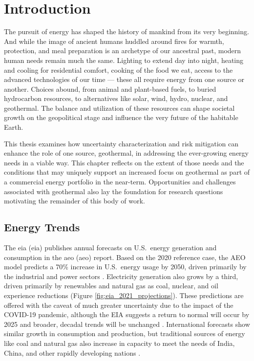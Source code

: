 \chapter{Introduction}\label{ch1:intro}
The pursuit of energy has shaped the history of mankind from its very beginning. And while the image of ancient humans huddled around fires for warmth, protection, and meal preparation is an archetype of our ancestral past, modern human needs remain much the same. Lighting to extend day into night, heating and cooling for residential comfort, cooking of the food we eat, access to the advanced technologies of our time --- these all require energy from one source or another. Choices abound, from animal and plant-based fuels, to buried hydrocarbon resources, to alternatives like solar, wind, hydro, nuclear, and geothermal. The balance and utilization of these resources can shape societal growth on the geopolitical stage and influence the very future of the habitable Earth.

This thesis examines how uncertainty characterization and risk mitigation can enhance the role of one source, geothermal, in addressing the ever-growing energy needs in a viable way. This chapter reflects on the extent of those needs and the conditions that may uniquely support an increased focus on geothermal as part of a commercial energy portfolio in the near-term. Opportunities and challenges associated with geothermal also lay the foundation for research questions motivating the remainder of this body of work.

\section{Energy Trends}\label{ch1:trends}
The \acrlong{eia} (\acrshort{eia}) publishes annual forecasts on U.S.\ energy generation and consumption in the \acrlong{aeo} (\acrshort{aeo}) report. Based on the 2020 reference case, the AEO model predicts a 70\% increase in U.S.\ energy usage by 2050, driven primarily by the industrial and power sectors \citep{eia_annual_2021}. Electricity generation also grows by a third, driven primarily by renewables and natural gas as coal, nuclear, and oil experience reductions (Figure \ref{fig:eia_2021_projections}). These predictions are offered with the caveat of much greater uncertainty due to the impact of the COVID-19 pandemic, although the EIA suggests a return to normal will occur by 2025 and broader, decadal trends will be unchanged \citep{eia_annual_2021}. International forecasts show similar growth in consumption and production, but traditional sources of energy like coal and natural gas also increase in capacity to meet the needs of India, China, and other rapidly developing nations \citep{eia_international_2020}. 
 
